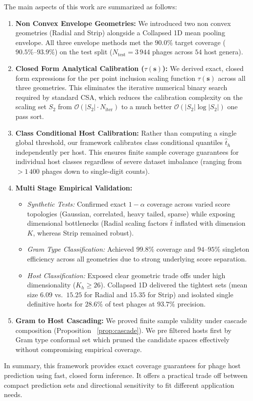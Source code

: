 The main aspects of this work are summarized as follows:
\begin{enumerate}[label=(\roman*)]
    \item \textbf{Non Convex Envelope Geometries:} We introduced two non convex geometries (Radial and Strip) alongside a 
           Collapsed 1D mean pooling envelope. All three envelope methods met the $90.0\%$ target coverage ($90.5\%\text{--}
           93.9\%$) on the test split ($N_{\text{test}} = 3\,944$ phages across $54$ host genera).
    
    \item \textbf{Closed Form Analytical Calibration ($\tau(\mathbf{s})$):} We derived exact, closed form expressions for the 
           per point inclusion scaling function $\tau(\mathbf{s})$ across all three geometries. This eliminates the iterative 
           numerical binary search required by standard CSA, which reduces the calibration complexity on the scaling set 
           $S_2$ from $\mathcal{O}(|S_2| \cdot N_{\text{iter}})$ to a much better $\mathcal{O}(|S_2| \log |S_2|)$ one pass sort.
    
    \item \textbf{Class Conditional Host Calibration:} Rather than computing a single global threshold, our framework 
          calibrates class conditional quantiles $\hat{t}_h$ independently per host. This ensures finite sample coverage 
          guarantees for individual host classes regardless of severe dataset imbalance (ranging from $>1\,400$ phages down 
          to single-digit counts).
    \newpage
    \item \textbf{Multi Stage Empirical Validation:}
    \begin{itemize}
        \item \emph{Synthetic Tests:} Confirmed exact $1-\alpha$ coverage across varied score topologies (Gaussian, correlated, 
               heavy tailed, sparse) while exposing dimensional bottlenecks (Radial scaling factors $\hat{t}$ inflated with 
               dimension $K$, whereas Strip remained robust).
        \item \emph{Gram Type Classification:} Achieved $99.8\%$ coverage and $94\text{--}95\%$ singleton efficiency across all 
               geometries due to strong underlying score separation.
        \item \emph{Host Classification:} Exposed clear geometric trade offs under high dimensionality ($K_h \ge 26$). 
               Collapsed 1D delivered the tightest sets (mean size $6.09$ vs.\ $15.25$ for Radial and $15.35$ for Strip) and 
               isolated single definitive hosts for $28.6\%$ of test phages at $93.7\%$ precision.
    \end{itemize}
    
    \item \textbf{Gram to Host Cascading:} We proved finite sample validity under cascade composition (Proposition
          ~\ref{prop:cascade}). We pre filtered hosts first by Gram type conformal set which pruned the candidate spaces 
          effectively without compromising empirical coverage.
\end{enumerate}

In summary, this framework provides exact coverage guarantees for phage host prediction using fast, closed form 
inference. It offers a practical trade off between compact prediction sets and directional sensitivity to fit different 
application needs.




